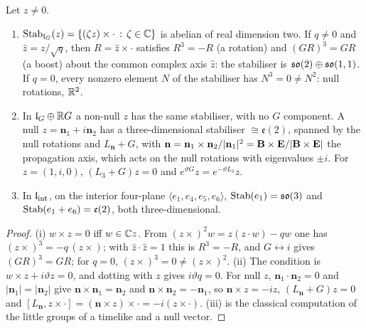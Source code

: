 \begin{theorem}
\label{en:stab}
Let $z\neq0$.
\begin{enumerate}[label=(\roman*),leftmargin=2.2em]
\item $\operatorname{Stab}_{\mathfrak l_G}(z)=\{(\zeta z)\times\cdot\,:\,\zeta\in\mathbb{C}\}$ is abelian of real dimension two. If $q\neq0$ and $\hat z=z/\sqrt q$, then
$R=\hat z\times\cdot$ satisfies $R^3=-R$ (a rotation) and $(GR)^3=GR$ (a boost) about the common complex axis $\hat z$: the stabiliser is
$\mathfrak{so}(2)\oplus\mathfrak{so}(1,1)$. If $q=0$, every nonzero element $N$ of the stabiliser has $N^3=0\neq N^2$: null rotations, $\mathbb{R}^2$.
\item In $\mathfrak l_G\oplus\mathbb{R} G$ a non-null $z$ has the same stabiliser, with no $G$ component. A null $z=\mathbf n_1+i\mathbf n_2$ has a three-dimensional
stabiliser $\cong\mathfrak e(2)$, spanned by the null rotations and $L_{\mathbf n}+G$, with $\mathbf n=\mathbf n_1\times\mathbf n_2/|\mathbf n_1|^2=\mathbf B\times\mathbf E/|\mathbf B\times\mathbf E|$
the propagation axis, which acts on the null rotations with eigenvalues $\pm i$. For $z=(1,i,0)$, $(L_3+G)z=0$ and $e^{\vartheta G}z=e^{-\vartheta L_3}z$.
\item In $\mathfrak l_{\rm int}$, on the interior four-plane $\langle e_1,e_4,e_5,e_6\rangle$, $\operatorname{Stab}(e_1)=\mathfrak{so}(3)$ and $\operatorname{Stab}(e_1+e_6)=\mathfrak e(2)$, both
three-dimensional.
\end{enumerate}
\end{theorem}

\begin{proof}
(i) $w\times z=0$ iff $w\in\mathbb{C} z$. From $(z\times)^2w=z(z\cdot w)-qw$ one has $(z\times)^3=-q\,(z\times)$; with $\hat z\cdot\hat z=1$ this is $R^3=-R$, and
$G\leftrightarrow i$ gives $(GR)^3=GR$; for $q=0$, $(z\times)^3=0\neq(z\times)^2$. (ii) The condition is $w\times z+i\vartheta z=0$, and dotting with $z$ gives
$i\vartheta q=0$. For null $z$, $\mathbf n_1\cdot\mathbf n_2=0$ and $|\mathbf n_1|=|\mathbf n_2|$ give $\mathbf n\times\mathbf n_1=\mathbf n_2$ and
$\mathbf n\times\mathbf n_2=-\mathbf n_1$, so $\mathbf n\times z=-iz$, $(L_{\mathbf n}+G)z=0$ and $[L_{\mathbf n},z\times\cdot]=(\mathbf n\times z)\times\cdot=-i(z\times\cdot)$.
(iii) is the classical computation of the little groups of a timelike and a null vector.
\end{proof}

